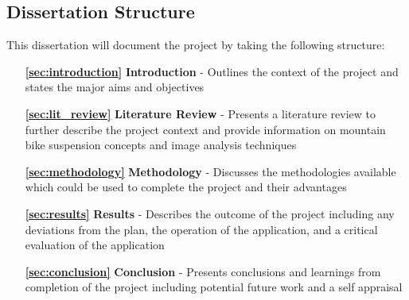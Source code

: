 \subsection{Dissertation Structure}
	This dissertation will document the project by taking the following structure:
	\begin{itemize}
		\item[\bfseries \ref{sec:introduction}] {\bfseries Introduction} - Outlines the context of the project and states the major aims and objectives
		\item[\bfseries \ref{sec:lit_review}]{\bfseries Literature Review} - Presents a literature review to further describe the project context and provide information on mountain bike suspension concepts and image analysis techniques
		\item[\bfseries \ref{sec:methodology}] {\bfseries Methodology} - Discusses the methodologies available which could be used to complete the project and their advantages
		\item[\bfseries \ref{sec:results}] {\bfseries Results} - Describes the outcome of the project including any deviations from the plan, the operation of the application, and a critical evaluation of the application
		\item[\bfseries \ref{sec:conclusion}] {\bfseries Conclusion} - Presents conclusions and learnings from completion of the project including potential future work and a self appraisal
	\end{itemize}
	